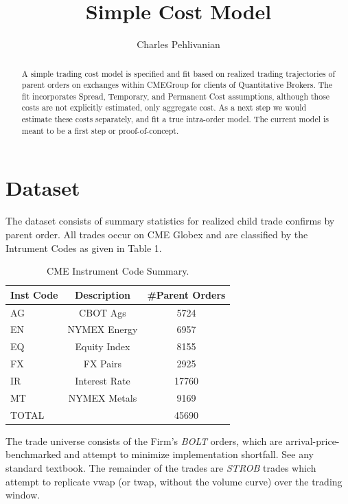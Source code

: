\documentclass{article}
\begin{document}
\title{Simple Cost Model}
\author{Charles Pehlivanian}

\maketitle

\begin{abstract}

A simple trading cost model is specified and fit based on realized trading trajectories of parent orders on exchanges within CMEGroup for clients of Quantitative Brokers. The fit incorporates Spread, Temporary, and Permanent Cost assumptions, although those costs are not explicitly estimated, only aggregate cost. As a next step we would estimate these costs separately, and fit a true intra-order model. The current model is meant to be a first step or proof-of-concept.

\end{abstract}
\section*{Dataset}

The dataset consists of summary statistics for realized child trade confirms by parent order. All trades occur on CME Globex and are classified by the Intrument Codes as given in Table 1.

\begin{table}
\centering
\begin{tabular}{|l|c|c|}
\hline
Inst Code & Description & \#Parent Orders\\
\hline
AG & CBOT Ags & 5724\\
EN & NYMEX Energy & 6957\\
EQ & Equity Index & 8155\\
FX & FX Pairs & 2925\\
IR & Interest Rate & 17760\\
MT & NYMEX Metals & 9169\\
\hline
\hline
TOTAL & & 45690\\
\hline
\end{tabular}
\caption{CME Instrument Code Summary.}
\label{tab:template}
\end{table}

The trade universe consists of the Firm's {\em BOLT} orders, which are arrival-price-benchmarked and attempt to minimize implementation shortfall. See any standard textbook. The remainder of the trades are {\em STROB} trades which attempt to replicate vwap (or twap, without the volume curve) over the trading window.
\end{document}
